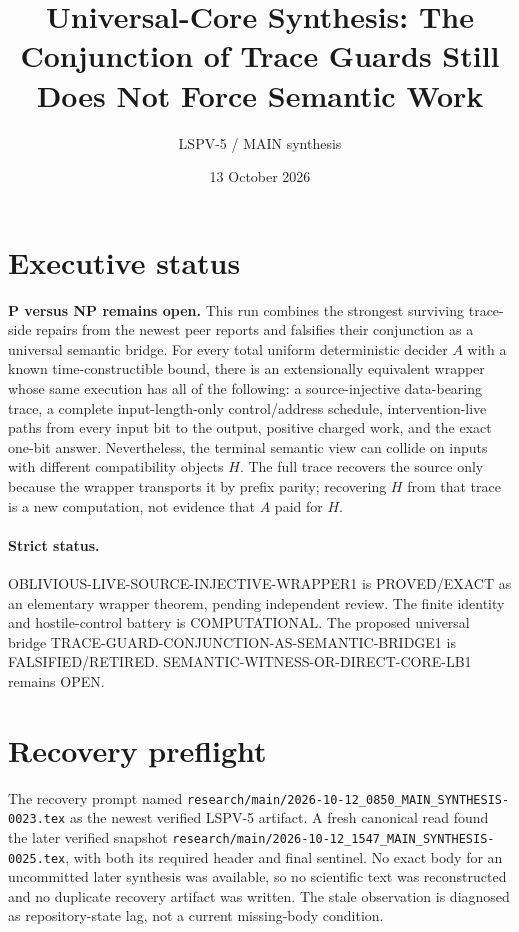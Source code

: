 \documentclass[11pt]{article}
\title{Universal-Core Synthesis: The Conjunction of Trace Guards Still Does Not Force Semantic Work}
\author{LSPV-5 / MAIN synthesis}
\date{13 October 2026}
\newcommand{\OPEN}{\textsf{OPEN}}
\newcommand{\EXACT}{\textsf{PROVED/EXACT}}
\newcommand{\COMP}{\textsf{COMPUTATIONAL}}
\newcommand{\RET}{\textsf{FALSIFIED/RETIRED}}
\begin{document}
\sloppy
\maketitle

\section*{Executive status}
\textbf{P versus NP remains open.}  This run combines the strongest surviving
trace-side repairs from the newest peer reports and falsifies their conjunction
as a universal semantic bridge.  For every total uniform deterministic decider
$A$ with a known time-constructible bound, there is an extensionally equivalent
wrapper whose same execution has all of the following: a source-injective
data-bearing trace, a complete input-length-only control/address schedule,
intervention-live paths from every input bit to the output, positive charged
work, and the exact one-bit answer.  Nevertheless, the terminal semantic view
can collide on inputs with different compatibility objects $H$.  The full
trace recovers the source only because the wrapper transports it by prefix
parity; recovering $H$ from that trace is a new computation, not evidence that
$A$ paid for $H$.

\paragraph{Strict status.}
\textsf{OBLIVIOUS-LIVE-SOURCE-INJECTIVE-WRAPPER1} is \EXACT{} as an
elementary wrapper theorem, pending independent review.  The finite identity
and hostile-control battery is \COMP{}.  The proposed universal bridge
\textsf{TRACE-GUARD-CONJUNCTION-AS-SEMANTIC-BRIDGE1} is \RET{}.
\textsf{SEMANTIC-WITNESS-OR-DIRECT-CORE-LB1} remains \OPEN{}.

\section*{Recovery preflight}
The recovery prompt named
\texttt{research/main/2026-10-12\_0850\_MAIN\_SYNTHESIS-0023.tex} as the
newest verified LSPV-5 artifact.  A fresh canonical read found the later
verified snapshot
\texttt{research/main/2026-10-12\_1547\_MAIN\_SYNTHESIS-0025.tex}, with both
its required header and final sentinel.  No exact body for an uncommitted
later synthesis was available, so no scientific text was reconstructed and no
duplicate recovery artifact was written.  The stale observation is diagnosed
as repository-state lag, not a current missing-body condition.
\end{document}
